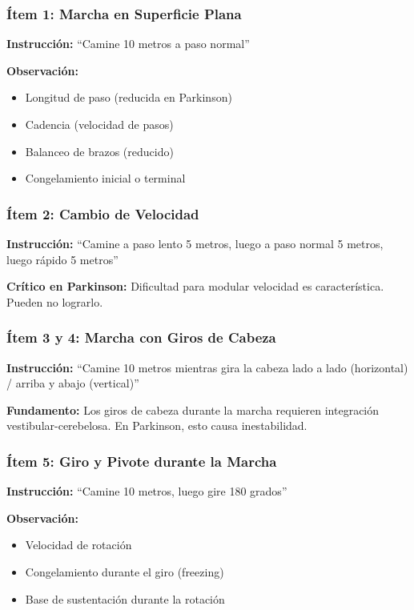 \documentclass[12pt,a4paper,spanish,oneside]{book}
\begin{document}
\subsubsection{Ítem 1: Marcha en Superficie Plana}

\textbf{Instrucción:} ``Camine 10 metros a paso normal''

\textbf{Observación:}
\begin{itemize}
  \item Longitud de paso (reducida en Parkinson)
  \item Cadencia (velocidad de pasos)
  \item Balanceo de brazos (reducido)
  \item Congelamiento inicial o terminal
\end{itemize}

\subsubsection{Ítem 2: Cambio de Velocidad}

\textbf{Instrucción:} ``Camine a paso lento 5 metros, luego a paso normal 5 metros, luego rápido 5 metros''

\textbf{Crítico en Parkinson:} Dificultad para modular velocidad es característica. Pueden no lograrlo.

\subsubsection{Ítem 3 y 4: Marcha con Giros de Cabeza}

\textbf{Instrucción:} ``Camine 10 metros mientras gira la cabeza lado a lado (horizontal) / arriba y abajo (vertical)''

\textbf{Fundamento:} Los giros de cabeza durante la marcha requieren integración vestibular-cerebelosa. En Parkinson, esto causa inestabilidad.

\subsubsection{Ítem 5: Giro y Pivote durante la Marcha}

\textbf{Instrucción:} ``Camine 10 metros, luego gire 180 grados''

\textbf{Observación:}
\begin{itemize}
  \item Velocidad de rotación
  \item Congelamiento durante el giro (freezing)
  \item Base de sustentación durante la rotación
\end{itemize}
\end{document}
